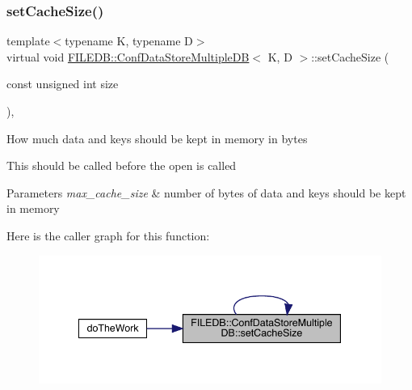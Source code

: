 \subsubsection{\texorpdfstring{setCacheSize()}{setCacheSize()}\hspace{0.1cm}{\footnotesize\ttfamily [1/2]}}
{\footnotesize\ttfamily template$<$typename K, typename D$>$ \\
virtual void \mbox{\hyperlink{classFILEDB_1_1ConfDataStoreMultipleDB}{F\+I\+L\+E\+D\+B\+::\+Conf\+Data\+Store\+Multiple\+DB}}$<$ K, D $>$\+::set\+Cache\+Size (\begin{DoxyParamCaption}\item[{const unsigned int}]{size }\end{DoxyParamCaption})\hspace{0.3cm}{\ttfamily [inline]}, {\ttfamily [virtual]}}

How much data and keys should be kept in memory in bytes

This should be called before the open is called 
\begin{DoxyParams}{Parameters}
{\em max\+\_\+cache\+\_\+size} & number of bytes of data and keys should be kept in memory \\
\hline
\end{DoxyParams}
Here is the caller graph for this function\+:\nopagebreak
\begin{figure}[H]
\begin{center}
\leavevmode
\includegraphics[width=341pt]{d3/dc0/classFILEDB_1_1ConfDataStoreMultipleDB_a37115269cf1f8f04c49ab888b040fa13_icgraph}
\end{center}
\end{figure}
\mbox{\label{classFILEDB_1_1ConfDataStoreMultipleDB_a37115269cf1f8f04c49ab888b040fa13}} 
